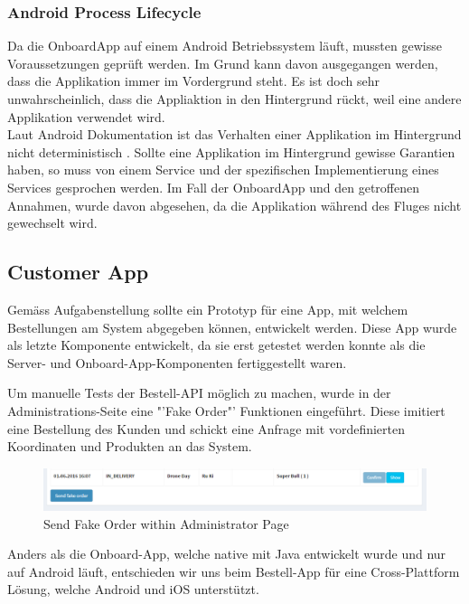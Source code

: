 \subsubsection{Android Process Lifecycle} 
Da die OnboardApp auf einem Android Betriebssystem läuft, mussten gewisse Voraussetzungen geprüft werden. Im Grund kann davon ausgegangen werden, dass die Applikation immer im Vordergrund steht. Es ist doch sehr unwahrscheinlich, dass die Appliaktion in den Hintergrund rückt, weil eine andere Applikation verwendet wird. \\
Laut Android Dokumentation ist das Verhalten einer Applikation im Hintergrund nicht deterministisch \cite{androidGuide}. Sollte eine Applikation im Hintergrund gewisse Garantien haben, so muss von einem Service und der spezifischen Implementierung eines Services gesprochen werden. Im Fall der OnboardApp und den getroffenen Annahmen, wurde davon abgesehen, da die Applikation während des Fluges nicht gewechselt wird.\\


\subsection{Customer App}
Gemäss Aufgabenstellung sollte ein Prototyp für eine App, mit welchem Bestellungen am System abgegeben können, entwickelt werden.
Diese App wurde als letzte Komponente entwickelt, da sie erst getestet werden konnte als die Server- und Onboard-App-Komponenten fertiggestellt waren.

Um manuelle Tests der Bestell-API möglich zu machen, wurde in der Administrations-Seite eine "'Fake Order"' Funktionen eingeführt. 
Diese imitiert eine Bestellung des Kunden und schickt eine Anfrage mit vordefinierten Koordinaten und Produkten an das System.

\begin{figure}[H]
	\centering
	\includegraphics[width=1\textwidth] {images/customer-app-fake-order.png}
	\caption{Send Fake Order within Administrator Page}
\end{figure}

Anders als die Onboard-App, welche native mit Java entwickelt wurde und nur auf Android läuft, entschieden wir uns beim Bestell-App für eine Cross-Plattform Lösung, welche Android und iOS unterstützt. \\

